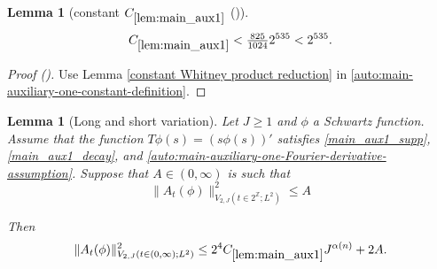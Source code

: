 \documentclass[12pt,reqno]{amsart}
\newcommand{\auto}{{({\tiny\faCar})}}
\theoremstyle{plain}
\newtheorem{lemma}[theorem]{Lemma}
\numberwithin{equation}{section}
\theoremstyle{remark}
\newcommand{\using}[1]{}
\begin{document}
\begin{lemma}[constant $C_{\ref{lem:main_aux1}}$ \auto]\label{constant main auxiliary one}\using{constant Whitney product reduction}\using{lem:main_aux1}
\begin{equation}\label{constant main auxiliary one bound}
C_{\ref{lem:main_aux1}}<\tfrac{825}{1024}2^{535}<2^{535}.
\end{equation}
\end{lemma}
\begin{proof}[Proof \auto]
Use Lemma \ref{constant Whitney product reduction} in \eqref{auto:main-auxiliary-one-constant-definition}.
\end{proof}

\begin{lemma}[Long and short variation]\label{lem:shortlongftc_reduction}\using{lem:shortlongjumps}\using{lem:ftccs-R}\using{lem:ftc_ATphi}\using{lem:main_aux1}
Let $J\ge 1$ and $\phi$ a Schwartz function.
Assume that the function $T\phi(s) = (s \phi(s))'$ satisfies \eqref{main_aux1_supp}, \eqref{main_aux1_decay}, and \eqref{auto:main-auxiliary-one-Fourier-derivative-assumption}.
Suppose that $A\in (0,\infty)$ is such that
\begin{equation}\label{shortlongftc_reduction1} \|A_{t}(\phi)\|^2_{V_{2,J}(t\in 2^\mathbb{Z}; L^2)} \le A
\end{equation}

Then
\begin{equation}\label{shortlongftc_reduction2}
\|A_{t}(\phi)\|_{V_{2,J}(t\in (0,\infty); L^2)}^2 \le 2^4 C_{\ref{lem:main_aux1}} J^{\alpha(n)} + 2A.
\end{equation}
\end{lemma}
\end{document}
